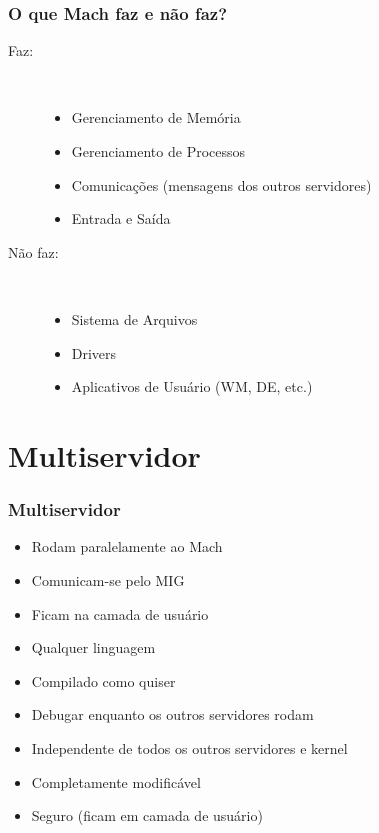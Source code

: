 \documentclass[10pt]{beamer}
\theoremstyle{plain}
\begin{document}
\begin{frame}
  \frametitle{O que Mach faz e não faz?}
  \begin{description}
    \item[Faz:]~\\
      \begin{itemize}
        \item Gerenciamento de Memória
        \item Gerenciamento de Processos
        \item Comunicações (mensagens dos outros servidores)
        \item Entrada e Saída
      \end{itemize}
    \item [Não faz:]~\\
      \begin{itemize}
        \item Sistema de Arquivos
        \item Drivers
        \item Aplicativos de Usuário (WM, DE, etc.)
      \end{itemize}
  \end{description}
\end{frame}

\section{Multiservidor}

\begin{frame}
  \frametitle{Multiservidor}
  \begin{itemize}
    \item Rodam paralelamente ao Mach
    \item Comunicam-se pelo MIG
    \item Ficam na camada de usuário
    \item Qualquer linguagem
    \item Compilado como quiser
    \item Debugar enquanto os outros servidores rodam
    \item Independente de todos os outros servidores e kernel
    \item Completamente modificável
    \item Seguro (ficam em camada de usuário)
  \end{itemize}
\end{frame}
\end{document}
